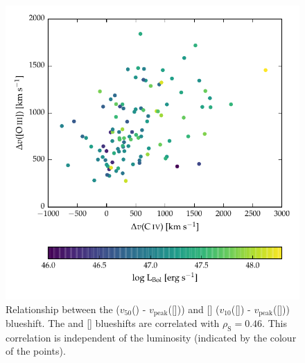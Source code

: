 \begin{figure}[t!]
    \centering
    \includegraphics[width=\linewidth]{figures/chapter04/civ_blueshift_oiii_blueshift.pdf}
    \caption[{Relationship between the  and [] blueshifts.}]{Relationship between the  ($v_{50}$() - $v_{\text{peak}}$([])) and [] ($v_{10}$([]) - $v_{\text{peak}}$([])) blueshift. The  and [] blueshifts are correlated with $\rho_{\text{S}}=0.46$. This correlation is independent of the luminosity (indicated by the colour of the points). }
    \label{fig:oiii_civ_blueshifts}
\end{figure}

